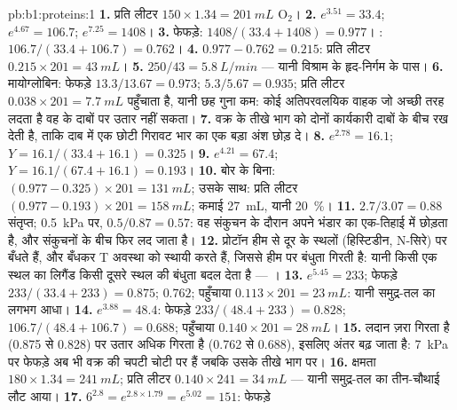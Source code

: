 \begin{solution}{pb:b1:proteins:1}
\textbf{1.} प्रति लीटर $150\times 1.34 = \qty{201}{mL}$ $\mathrm{O_2}$।
\textbf{2.} $e^{3.51} = 33.4$; $e^{4.67} = 106.7$; $e^{7.25} = 1408$।
\textbf{3.} फेफड़े: $1408/(33.4 + 1408) = 0.977$। :
$106.7/(33.4 + 106.7) = 0.762$।
\textbf{4.} $0.977 - 0.762 = 0.215$: प्रति लीटर $0.215\times 201 = \qty{43}{mL}$।
\textbf{5.} $250/43 = \qty{5.8}{L/min}$ --- यानी विश्राम के
हृद-निर्गम के पास।
\textbf{6.} मायोग्लोबिन: फेफड़े $13.3/13.67 = 0.973$; 
$5.3/5.67 = 0.935$; प्रति लीटर $0.038\times 201 = \qty{7.7}{mL}$
पहुँचाता है, यानी छह गुना कम: कोई अतिपरवलयिक वाहक जो अच्छी तरह लदता है वह
 के दाबों पर उतार नहीं सकता।
\textbf{7.}  वक्र के तीखे भाग को दोनों कार्यकारी दाबों के बीच
रख देती है, ताकि दाब में एक छोटी गिरावट भार का एक बड़ा अंश छोड़ दे।
\textbf{8.} $e^{2.78} = 16.1$; $Y = 16.1/(33.4 + 16.1) = 0.325$।
\textbf{9.} $e^{4.21} = 67.4$; $Y = 16.1/(67.4 + 16.1) = 0.193$।
\textbf{10.} बोर के बिना: $(0.977 - 0.325)\times 201 = \qty{131}{mL}$;
उसके साथ: प्रति लीटर $(0.977 - 0.193)\times 201 = \qty{158}{mL}$; कमाई
\qty{27}{mL}, यानी \qty{20}{\%}।
\textbf{11.} $2.7/3.07 = 0.88$ संतृप्त; \qty{0.5}{kPa} पर,
$0.5/0.87 = 0.57$: वह संकुचन के दौरान अपने भंडार का एक-तिहाई
 में छोड़ता है, और संकुचनों के बीच फिर लद जाता है।
\textbf{12.} प्रोटॉन हीम से दूर के स्थलों (हिस्टिडीन, N-सिरे) पर बँधते
हैं, और बँधकर T अवस्था को स्थायी करते हैं, जिससे हीम पर बंधुता गिरती है:
यानी किसी एक स्थल का लिगैंड किसी दूसरे स्थल की बंधुता बदल देता है ---
।
\textbf{13.} $e^{5.45} = 233$; फेफड़े $233/(33.4 + 233) = 0.875$;
 $0.762$; पहुँचाया $0.113\times 201 = \qty{23}{mL}$: यानी समुद्र-तल
का लगभग आधा।
\textbf{14.} $e^{3.88} = 48.4$: फेफड़े $233/(48.4 + 233) = 0.828$;
 $106.7/(48.4 + 106.7) = 0.688$; पहुँचाया $0.140\times 201 =
\qty{28}{mL}$।
\textbf{15.} लदान ज़रा गिरता है (0.875 से 0.828) पर
उतार अधिक गिरता है (0.762 से 0.688), इसलिए अंतर बढ़ जाता है:
\qty{7}{kPa} पर फेफड़े अब भी वक्र की चपटी चोटी पर हैं जबकि
 उसके तीखे भाग पर।
\textbf{16.} क्षमता $180\times 1.34 = \qty{241}{mL}$; प्रति लीटर $0.140\times
241 = \qty{34}{mL}$ --- यानी समुद्र-तल का तीन-चौथाई लौट आया।
\textbf{17.} $6^{2.8} = e^{2.8\times 1.79} = e^{5.02} = 151$: फेफड़े

\end{solution}
